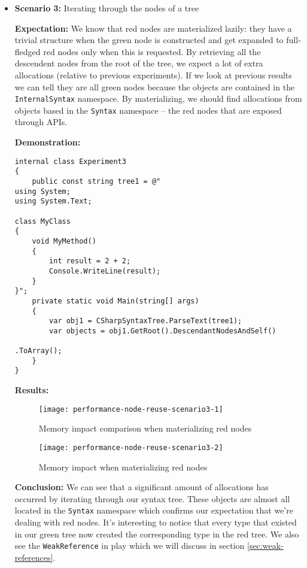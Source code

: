 \begin{itemize}
\item \textbf{Scenario 3:} Iterating through the nodes of a tree

\textbf{Expectation:} We know that red nodes are materialized lazily: they have a trivial structure when the green node is constructed and get expanded to full-fledged red nodes only when this is requested. By retrieving all the descendent nodes from the root of the tree, we expect a lot of extra allocations (relative to previous experiments). If we look at previous results we can tell they are all green nodes because the objects are contained in the \verb|InternalSyntax| namespace. By materializing, we should find allocations from objects based in the \verb|Syntax| namespace -- the red nodes that are exposed through APIs.

\textbf{Demonstration:} 

\begin{lstlisting}
internal class Experiment3
{
    public const string tree1 = @"
using System;
using System.Text;

class MyClass 
{
    void MyMethod()
    {
        int result = 2 + 2;
        Console.WriteLine(result);
    }
}";
    private static void Main(string[] args)
	{
		var obj1 = CSharpSyntaxTree.ParseText(tree1);
		var objects = obj1.GetRoot().DescendantNodesAndSelf()
															  .ToArray();
	}
}
\end{lstlisting}

\textbf{Results:}

\begin{figure}[H]
\centering
\texttt{[image: performance-node-reuse-scenario3-1]}
\caption{Memory impact comparison when materializing red nodes}
\label{img:performance-node-reuse-scenario3-1}
\end{figure}

\begin{figure}[H]
\centering
\texttt{[image: performance-node-reuse-scenario3-2]}
\caption{Memory impact when materializing red nodes}
\label{img:performance-node-reuse-scenario3-2}
\end{figure}

\textbf{Conclusion:} We can see that a significant amount of allocations has occurred by iterating through our syntax tree. These objects are almost all located in the \verb|Syntax| namespace which confirms our expectation that we're dealing with red nodes. It's interesting to notice that every type that existed in our green tree now created the corresponding type in the red tree. We also see the \verb|WeakReference| in play which we will discuss in section \ref{sec:weak-references}.




\end{itemize}